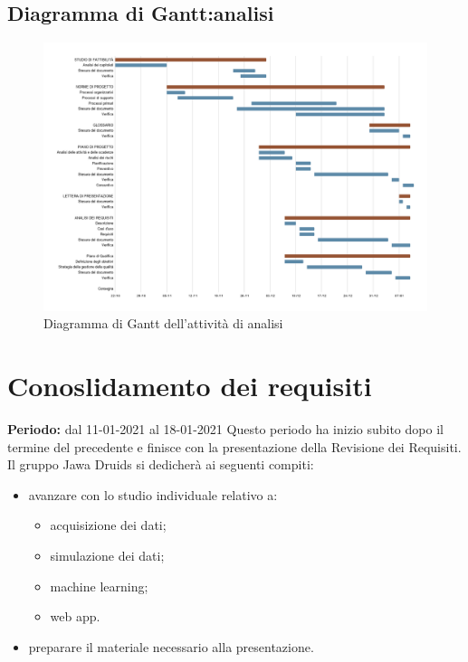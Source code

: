 \subsection{Diagramma di Gantt:analisi}\label{PianificazioneDiagrammaDiGanttAnalisi}
\begin{figure}[!ht]
	\begin{center}
		\includegraphics[width=1\linewidth]{../immagini/pdp/gantt_analisi.png}
		\caption{Diagramma di Gantt dell'attività di analisi}
	\end{center}
\end{figure}

\section{Conoslidamento dei requisiti}\label{PianificazioneConsolidamentoDeiRequisiti}
\textbf{Periodo:} dal 11-01-2021 al 18-01-2021
Questo periodo ha inizio subito dopo il termine del precedente e finisce con la presentazione della Revisione dei Requisiti.
Il gruppo Jawa Druids si dedicherà ai seguenti compiti:
\begin{itemize}
	\item avanzare con lo studio individuale relativo a:
	\begin{itemize}
		\item acquisizione dei dati;
		\item simulazione dei dati;
		\item machine learning;
		\item web app.
	\end{itemize}
	\item preparare il materiale necessario alla presentazione.
\end{itemize}
